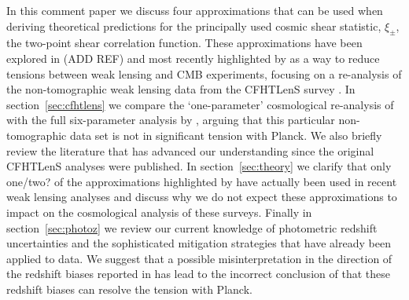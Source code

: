 \documentclass[preprint]{aastex}
\begin{document}
In this comment paper we discuss four approximations that can be used when deriving theoretical predictions for the principally used cosmic shear statistic, $\xi_\pm$, the two-point shear correlation function.   These approximations have been explored in (ADD REF) and most recently highlighted by \citet{kitching/etal:2016} as a way to reduce tensions between weak lensing and CMB experiments, focusing on a re-analysis of the non-tomographic weak lensing data from the CFHTLenS survey \citep{kilbinger/etal:2013}.    In section~\ref{sec:cfhtlens} we compare the `one-parameter' cosmological re-analysis of \citet{kitching/etal:2016} with the full six-parameter analysis by \citet{kilbinger/etal:2013}, arguing that this particular non-tomographic data set is not in significant tension with Planck.  We also briefly review the literature that has advanced our understanding since the original CFHTLenS analyses were published.  In section~\ref{sec:theory} we clarify that only one/two? of the approximations highlighted by \citet{kitching/etal:2016} have actually been used in recent weak lensing analyses \citep{joudaki/etal:2016, hildebrandt/etal:2016, joudaki/etal:2017} and discuss why we do not expect these approximations to impact on the cosmological analysis of these surveys.    Finally in section~\ref{sec:photoz} we review our current knowledge of photometric redshift uncertainties and the sophisticated mitigation strategies that have already been applied to data.  We suggest that a possible misinterpretation in the direction of the redshift biases reported in \citet{choi/etal:2016} has lead to the incorrect conclusion of \citet{kitching/etal:2016} that these redshift biases can resolve the tension with Planck.  

\end{document}
